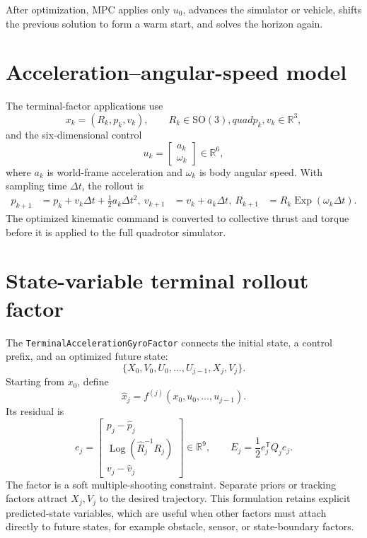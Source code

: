 \documentclass[11pt]{article}
\newcommand{\SO}{\mathrm{SO}(3)}
\newcommand{\R}{\mathbb{R}}
\newcommand{\Exp}{\operatorname{Exp}}
\newcommand{\Log}{\operatorname{Log}}
\newcommand{\transpose}{\mathsf{T}}
\begin{document}
After optimization, MPC applies only $u_0$, advances the simulator or vehicle, shifts the previous
solution to form a warm start, and solves the horizon again.

\section{Acceleration--angular-speed model}

The terminal-factor applications use
\begin{equation}
x_k=(R_k,p_k,v_k),\qquad R_k\in\SO,quad p_k,v_k\in\R^3,
\end{equation}
and the six-dimensional control
\begin{equation}
u_k=\begin{bmatrix}a_k\\\omega_k\end{bmatrix}\in\R^6,
\end{equation}
where $a_k$ is world-frame acceleration and $\omega_k$ is body angular speed.  With sampling time
$\Delta t$, the rollout is
\begin{align}
p_{k+1} &= p_k+v_k\Delta t+\frac{1}{2}a_k\Delta t^2,\label{eq:position}\
v_{k+1} &= v_k+a_k\Delta t,\label{eq:velocity}\
R_{k+1} &= R_k\Exp(\omega_k\Delta t).\label{eq:rotation}
\end{align}
The optimized kinematic command is converted to collective thrust and torque before it is applied
to the full quadrotor simulator.

\section{State-variable terminal rollout factor}

The \texttt{TerminalAccelerationGyroFactor} connects the initial state, a control prefix, and an
optimized future state:
\begin{equation}
\{X_0,V_0,U_0,\ldots,U_{j-1},X_j,V_j\}.
\end{equation}
Starting from $x_0$, define
\begin{equation}
\widehat{x}_j=f^{(j)}(x_0,u_0,\ldots,u_{j-1}).
\end{equation}
Its residual is
\begin{equation}
e_j=
\begin{bmatrix}
p_j-\widehat p_j\\
\Log(\widehat R_j^{-1}R_j)\\
v_j-\widehat v_j
\end{bmatrix}\in\R^9,
\qquad
E_j=\frac{1}{2}e_j^\transpose Q_j e_j.
\label{eq:state-terminal-residual}
\end{equation}
The factor is a soft multiple-shooting constraint.  Separate priors or tracking factors attract
$X_j,V_j$ to the desired trajectory.  This formulation retains explicit predicted-state variables,
which are useful when other factors must attach directly to future states, for example obstacle,
sensor, or state-boundary factors.
\end{document}
